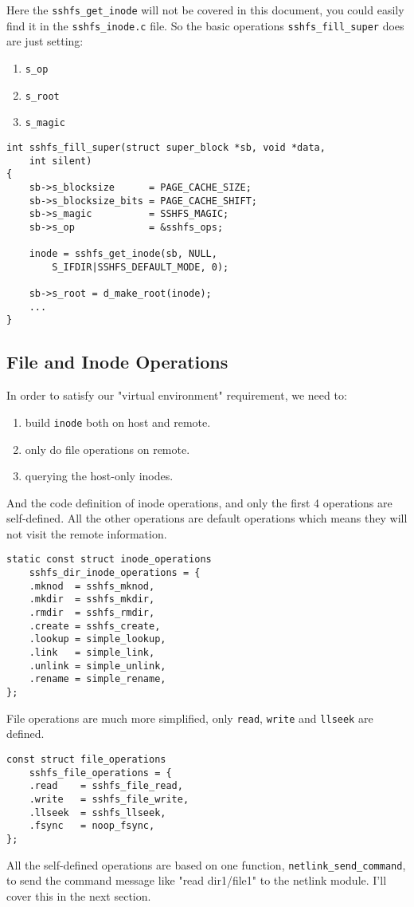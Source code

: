 Here the \lstinline{sshfs_get_inode} will not be covered in this document, you could easily find it in the \lstinline{sshfs_inode.c} file. So the basic operations \lstinline{sshfs_fill_super} does are just setting:
\begin{enumerate}
\item \lstinline{s_op}
\item \lstinline{s_root} 
\item \lstinline{s_magic}
\end{enumerate}
\begin{lstlisting}
int sshfs_fill_super(struct super_block *sb, void *data, 
	int silent)
{
    sb->s_blocksize      = PAGE_CACHE_SIZE;
    sb->s_blocksize_bits = PAGE_CACHE_SHIFT;
    sb->s_magic          = SSHFS_MAGIC;
    sb->s_op             = &sshfs_ops;

    inode = sshfs_get_inode(sb, NULL, 
		S_IFDIR|SSHFS_DEFAULT_MODE, 0);

    sb->s_root = d_make_root(inode);
	...
}
\end{lstlisting}

\subsection{File and Inode Operations}

In order to satisfy our "virtual environment" requirement, we need to:
\begin{enumerate}
\item build \lstinline{inode} both on host and remote.
\item only do file operations on remote.
\item querying the host-only inodes.
\end{enumerate}

And the code definition of inode operations, and only the first 4 operations are self-defined. All the other operations are default operations which means they will not visit the remote information.

\begin{lstlisting}[title=\bfseries inode operations]
static const struct inode_operations 
	sshfs_dir_inode_operations = {
    .mknod  = sshfs_mknod,
    .mkdir  = sshfs_mkdir,
    .rmdir  = sshfs_rmdir,
    .create = sshfs_create,
    .lookup = simple_lookup,
    .link   = simple_link,
    .unlink = simple_unlink,
    .rename = simple_rename,
};
\end{lstlisting}

File operations are much more simplified, only \lstinline{read}, \lstinline{write} and \lstinline{llseek} are defined.

\begin{lstlisting}[title=\bfseries file operations]
const struct file_operations 
	sshfs_file_operations = {
    .read    = sshfs_file_read,
    .write   = sshfs_file_write,
    .llseek  = sshfs_llseek,
    .fsync   = noop_fsync,
};
\end{lstlisting}

All the self-defined operations are based on one function, \lstinline{netlink_send_command}, to send the command message like "read dir1/file1" to the netlink module. I'll cover this in the next section.


